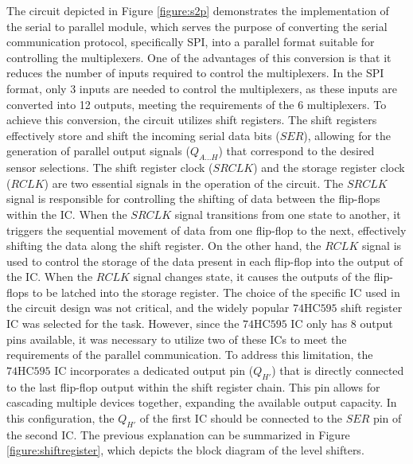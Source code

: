 The circuit depicted in Figure \ref{figure:s2p} demonstrates the implementation of the serial to parallel module, which serves the purpose of converting the serial communication protocol, specifically \ac{SPI}, into a parallel format suitable for controlling the multiplexers. One of the advantages of this conversion is that it reduces the number of inputs required to control the multiplexers. In the \ac{SPI} format, only 3 inputs are needed to control the multiplexers, as these inputs are converted into 12 outputs, meeting the requirements of the 6 multiplexers. To achieve this conversion, the circuit utilizes shift registers. The shift registers effectively store and shift the incoming serial data bits ($SER$), allowing for the generation of parallel output signals ($Q_{A...H}$) that correspond to the desired sensor selections. The shift register clock ($SRCLK$) and the storage register clock ($RCLK$) are two essential signals in the operation of the circuit. The $SRCLK$ signal is responsible for controlling the shifting of data between the flip-flops within the \ac{IC}. When the $SRCLK$ signal transitions from one state to another, it triggers the sequential movement of data from one flip-flop to the next, effectively shifting the data along the shift register. On the other hand, the $RCLK$ signal is used to control the storage of the data present in each flip-flop into the output of the \ac{IC}. When the $RCLK$ signal changes state, it causes the outputs of the flip-flops to be latched into the storage register. The choice of the specific \ac{IC} used in the circuit design was not critical, and the widely popular $\mathrm{74HC595}$ shift register \ac{IC} was selected for the task. However, since the $\mathrm{74HC595}$ \ac{IC} only has 8 output pins available, it was necessary to utilize two of these \ac{IC}s to meet the requirements of the parallel communication. To address this limitation, the $\mathrm{74HC595}$ \ac{IC} incorporates a dedicated output pin ($Q_{H'}$) that is directly connected to the last flip-flop output within the shift register chain. This pin allows for cascading multiple devices together, expanding the available output capacity. In this configuration, the $Q_{H'}$ of the first \ac{IC} should be connected to the $SER$ pin of the second \ac{IC}. The previous explanation can be summarized in Figure \ref{figure:shiftregister}, which depicts the block diagram of the level shifters.


